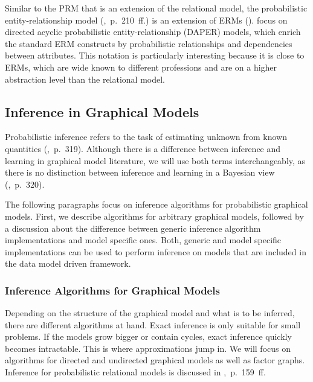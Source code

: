 Similar to the PRM that is an extension of the relational model, the probabilistic entity-relationship model (\cite{heckerman2007probabilistic},~p.~210~ff.) is an extension of ERMs (\cite{chen1976entity}). \cite{heckerman2007probabilistic} focus on directed acyclic probabilistic entity-relationship (DAPER) models, which enrich the standard ERM constructs by probabilistic relationships and dependencies between attributes. This notation is particularly interesting because it is close to ERMs, which are wide known to different professions and are on a higher abstraction level than the relational model.

\subsection{Inference in Graphical Models}
\label{subsec:inference}

Probabilistic inference refers to the task of estimating unknown from known quantities (\cite{murphy2012machine},~p.~319). Although there is a difference between inference and learning in graphical model literature, we will use both terms interchangeably, as there is no distinction between inference and learning in a Bayesian view (\cite{murphy2012machine},~p.~320).

The following paragraphs focus on inference algorithms for probabilistic graphical models. First, we describe algorithms for arbitrary graphical models, followed by a discussion about the difference between generic inference algorithm implementations and model specific ones. Both, generic and model specific implementations can be used to perform inference on models that are included in the data model driven framework.

\subsubsection{Inference Algorithms for Graphical Models}

Depending on the structure of the graphical model and what is to be inferred, there are different algorithms at hand. Exact inference is only suitable for small problems. If the models grow bigger or contain cycles, exact inference quickly becomes intractable. This is where approximations jump in. We will focus on algorithms for directed and undirected graphical models as well as factor graphs. Inference for probabilistic relational models is discussed in \textcite{getoor2007introduction},~p.~159~ff.

